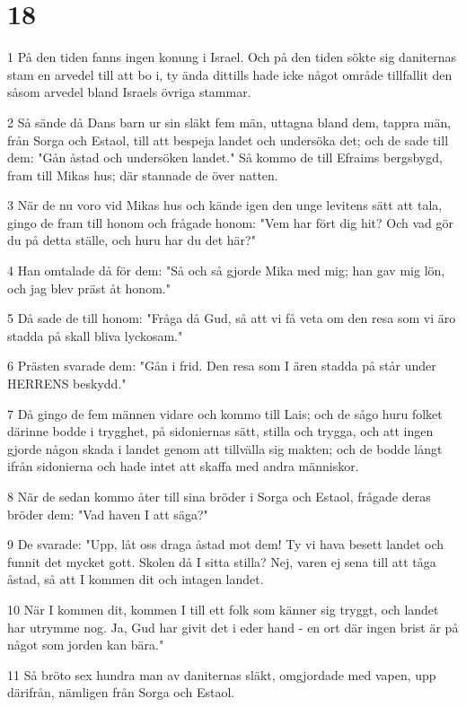 \chapter{18}

\par 1 På den tiden fanns ingen konung i Israel. Och på den tiden sökte sig daniternas stam en arvedel till att bo i, ty ända dittills hade icke något område tillfallit den såsom arvedel bland Israels övriga stammar.
\par 2 Så sände då Dans barn ur sin släkt fem män, uttagna bland dem, tappra män, från Sorga och Estaol, till att bespeja landet och undersöka det; och de sade till dem: "Gån åstad och undersöken landet." Så kommo de till Efraims bergsbygd, fram till Mikas hus; där stannade de över natten.
\par 3 När de nu voro vid Mikas hus och kände igen den unge levitens sätt att tala, gingo de fram till honom och frågade honom: "Vem har fört dig hit? Och vad gör du på detta ställe, och huru har du det här?"
\par 4 Han omtalade då för dem: "Så och så gjorde Mika med mig; han gav mig lön, och jag blev präst åt honom."
\par 5 Då sade de till honom: "Fråga då Gud, så att vi få veta om den resa som vi äro stadda på skall bliva lyckosam."
\par 6 Prästen svarade dem: "Gån i frid. Den resa som I ären stadda på står under HERRENS beskydd."
\par 7 Då gingo de fem männen vidare och kommo till Lais; och de sågo huru folket därinne bodde i trygghet, på sidoniernas sätt, stilla och trygga, och att ingen gjorde någon skada i landet genom att tillvälla sig makten; och de bodde långt ifrån sidonierna och hade intet att skaffa med andra människor.
\par 8 När de sedan kommo åter till sina bröder i Sorga och Estaol, frågade deras bröder dem: "Vad haven I att säga?"
\par 9 De svarade: "Upp, låt oss draga åstad mot dem! Ty vi hava besett landet och funnit det mycket gott. Skolen då I sitta stilla? Nej, varen ej sena till att tåga åstad, så att I kommen dit och intagen landet.
\par 10 När I kommen dit, kommen I till ett folk som känner sig tryggt, och landet har utrymme nog. Ja, Gud har givit det i eder hand - en ort där ingen brist är på något som jorden kan bära."
\par 11 Så bröto sex hundra man av daniternas släkt, omgjordade med vapen, upp därifrån, nämligen från Sorga och Estaol.
